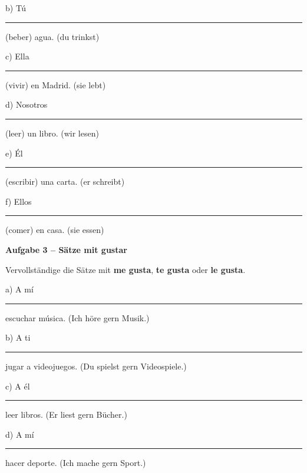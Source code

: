 \documentclass[11pt, a4paper]{article}
\newcommand{\fachfarbe}{spanisch}
\newcommand{\punktebox}[1]{\hfill\fbox{\small \_/#1}}
\newcommand{\luecke}[1]{\rule{#1}{0.4pt}}
\newenvironment{aufgabe}[1]{%
    \needspace{5\baselineskip}%
    \nopagebreak[4]%
    \vspace{10pt}
    \noindent\textbf{\textcolor{\fachfarbe}{Aufgabe #1}}
    \nopagebreak[4]%
    \vspace{5pt}
    \nopagebreak[4]%
    \begin{list}{}{\leftmargin=0pt}
    \item[]
}{%
    \end{list}
}
\newcommand{\es}[1]{\textcolor{\fachfarbe}{\textbf{#1}}}
\begin{document}
\vspace{0.8em}

\noindent
b) Tú \luecke{2.5cm} (beber) agua. \hfill (du trinkst)

\vspace{0.8em}

\noindent
c) Ella \luecke{2.5cm} (vivir) en Madrid. \hfill (sie lebt)

\vspace{0.8em}

\noindent
d) Nosotros \luecke{2.5cm} (leer) un libro. \hfill (wir lesen)

\vspace{0.8em}

\noindent
e) Él \luecke{2.5cm} (escribir) una carta. \hfill (er schreibt)

\vspace{0.8em}

\noindent
f) Ellos \luecke{2.5cm} (comer) en casa. \hfill (sie essen)

\vspace{15pt}


\begin{aufgabe}{3 -- Sätze mit gustar}
Vervollständige die Sätze mit \es{me gusta}, \es{te gusta} oder \es{le gusta}. \punktebox{4}
\end{aufgabe}

\noindent
a) A mí \luecke{3cm} escuchar música. \hfill (Ich höre gern Musik.)

\vspace{0.8em}

\noindent
b) A ti \luecke{3cm} jugar a videojuegos. \hfill (Du spielst gern Videospiele.)

\vspace{0.8em}

\noindent
c) A él \luecke{3cm} leer libros. \hfill (Er liest gern Bücher.)

\vspace{0.8em}

\noindent
d) A mí \luecke{3cm} hacer deporte. \hfill (Ich mache gern Sport.)

\vspace{15pt}

\end{document}
